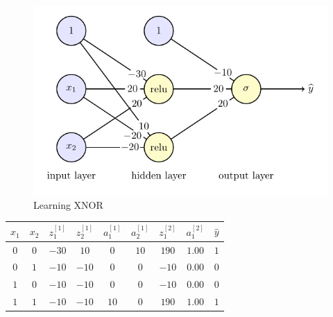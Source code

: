 \documentclass{beamer}
\begin{document}
\begin{frame}{}
    \begin{figure}
        \includegraphics[scale=0.69]{./xnor/xnor.pdf}
        \caption{Learning XNOR}
    \end{figure}

    \begin{center}
    \begin{tabular}{cc|cccc|cc|c}
        $x_1$ & $x_2$ & $z_1^{[1]}$ & $z_2^{[1]}$ & $a_1^{[1]}$ & $a_2^{[1]}$ & $z_1^{[2]}$ & $a_1^{[2]}$ & $\widehat{y}$\\\hline
        $0$ & $0$ & $-30$ & $10$ & $0$ & $10$ & $190$ & $1.00$ & $1$\\ 
        $0$ & $1$ & $-10$ & $-10$ & $0$ & $0$ & $-10$ & $0.00$ & $0$ \\ 
        $1$ & $0$ & $-10$ & $-10$ & $0$ & $0$ & $-10$ & $0.00$ & $0$\\
        $1$ & $1$ & $-10$ & $-10$ & $10$ & $0$ & $190$ & $1.00$ & $1$
    \end{tabular}
\end{center}
\end{frame}
\end{document}
